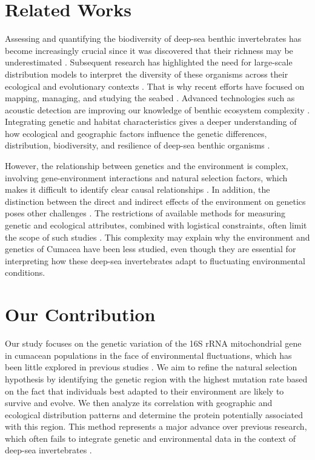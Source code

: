 \section{Related Works}\label{related-works}
Assessing and quantifying the biodiversity of deep-sea benthic invertebrates has become increasingly crucial since it was discovered that their richness may be underestimated \citep{grassle1992deep}. Subsequent research has highlighted the need for large-scale distribution models to interpret the diversity of these organisms across their ecological and evolutionary contexts \citep{rex1997large}. That is why recent efforts have focused on mapping, managing, and studying the seabed \citep{brown2011benthic}. Advanced technologies such as acoustic detection are improving our knowledge of benthic ecosystem complexity \citep{brown2011benthic}. Integrating genetic and habitat characteristics gives a deeper understanding of how ecological and geographic factors influence the genetic differences, distribution, biodiversity, and resilience of deep-sea benthic organisms \citep{vrijenhoek2009cryptic}.

However, the relationship between genetics and the environment is complex, involving gene-environment interactions and natural selection factors, which makes it difficult to identify clear causal relationships \citep{balkenhol_identifying_2009}. In addition, the distinction between the direct and indirect effects of the environment on genetics poses other challenges \citep{manel_perspectives_2010, balkenhol_landscape_2019}. The restrictions of available methods for measuring genetic and ecological attributes, combined with logistical constraints, often limit the scope of such studies \citep{manel_perspectives_2010, shafer_widespread_2013}. This complexity may explain why the environment and genetics of Cumacea have been less studied, even though they are essential for interpreting how these deep-sea invertebrates adapt to fluctuating environmental conditions.

\section{Our Contribution}\label{contribution}
Our study focuses on the genetic variation of the 16S rRNA mitochondrial gene in cumacean populations in the face of environmental fluctuations, which has been little explored in previous studies \citep{grassle1992deep, rex2000latitudinal}. We aim to refine the natural selection hypothesis by identifying the genetic region with the highest mutation rate based on the fact that individuals best adapted to their environment are likely to survive and evolve. We then analyze its correlation with geographic and ecological distribution patterns and determine the protein potentially associated with this region. This method represents a major advance over previous research, which often fails to integrate genetic and environmental data in the context of deep-sea invertebrates \citep{etter1990population, vrijenhoek2009cryptic}.

